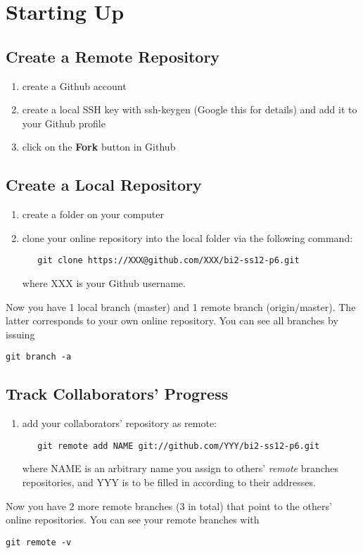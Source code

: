 \documentclass[12pt,a4paper,notitlepage,onecolumn]{article}
\title{\Title}
\author{\Author}
\date{\today}
\begin{document}
\maketitle

\section{Starting Up}
\subsection{Create a Remote Repository}
\begin{enumerate}
 \item create a Github account
 \item create a local SSH key with ssh-keygen (Google this for details) and add it to your Github profile
 \item click on the {\bf Fork} button in Github
\end{enumerate}

\subsection{Create a Local Repository}
\begin{enumerate}
 \item create a folder on your computer
 \item clone your online repository into the local folder via the following command:
  \begin{verbatim}
   git clone https://XXX@github.com/XXX/bi2-ss12-p6.git
  \end{verbatim}
  where XXX is your Github username.
\end{enumerate}
Now you have 1 local branch (master) and 1 remote branch (origin/master). The latter corresponds to your own online repository. You can see all branches by issuing
\begin{verbatim}
git branch -a
\end{verbatim}

\subsection{Track Collaborators' Progress}
\begin{enumerate}
 \item add your collaborators' repository as remote:
  \begin{verbatim}
   git remote add NAME git://github.com/YYY/bi2-ss12-p6.git
  \end{verbatim}
  where NAME is an arbitrary name you assign to others' {\it remote} branches repositories, and YYY is to be filled in according to their addresses.
\end{enumerate}
Now you have 2 more remote branches (3 in total) that point to the others' online repositories. You can see your remote branches with
\begin{verbatim}
git remote -v
\end{verbatim}
\end{document}
